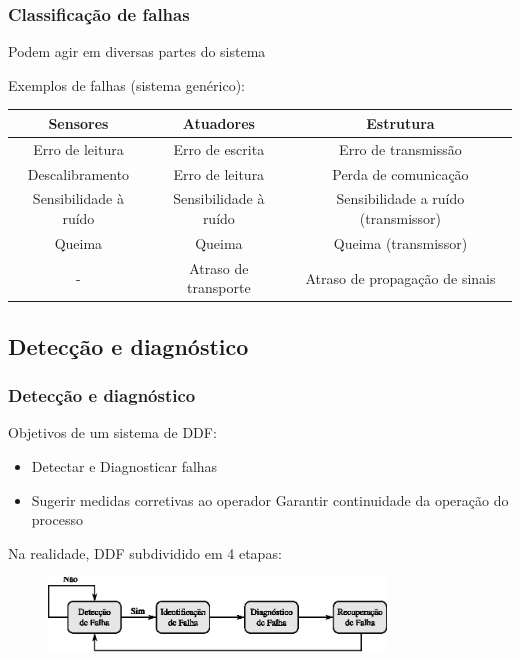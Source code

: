 \documentclass{beamer}
\begin{document}
\begin{frame}
    \frametitle{Classificação de falhas}

    Podem agir em diversas partes do sistema

    \vspace{0.25cm}

    Exemplos de falhas (sistema genérico):

\begin{table}[htb]
\scriptsize
\centering
\begin{tabular}{|c|c|c|}
\hline
{\bf Sensores} & {\bf Atuadores} & {\bf Estrutura}\\
\hline
\hline
Erro de leitura & Erro de escrita & Erro de transmissão\\
\hline
Descalibramento & Erro de leitura & Perda de comunicação\\
\hline
Sensibilidade à ruído & Sensibilidade à ruído & Sensibilidade a ruído
(transmissor)\\
\hline
Queima & Queima & Queima (transmissor)\\
\hline
- & Atraso de transporte & Atraso de propagação de sinais\\
\hline
\end{tabular}
\end{table}

\end{frame}

\subsection{Detecção e diagnóstico}
\begin{frame}
    \frametitle{Detecção e diagnóstico}

    Objetivos de um sistema de DDF:

\begin{itemize}
    \item Detectar e Diagnosticar falhas
    \item Sugerir medidas corretivas ao operador \implica Garantir continuidade
          da operação do processo
\end{itemize}

    Na realidade, DDF subdividido em 4 etapas:

\begin{figure}[htb]
\centering
    \includegraphics[width=0.8\textwidth]
    {imgs/detec_diag/eps/fases_monitoramento}
\end{figure}
\end{frame}
\end{document}
